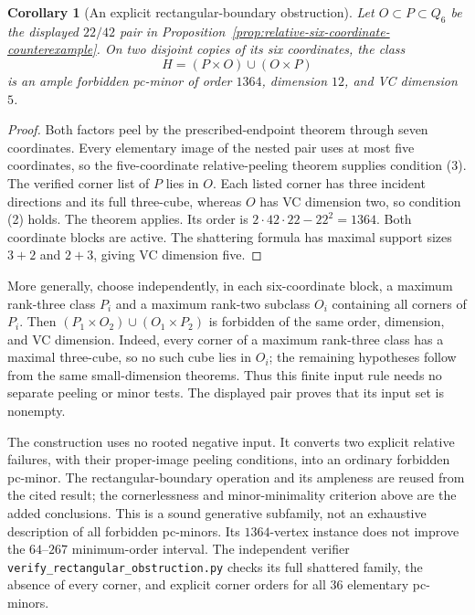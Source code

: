 \documentclass[11pt]{article}
\numberwithin{equation}{section}
\newtheorem{corollary}[theorem]{Corollary}
\theoremstyle{definition}
\theoremstyle{remark}
\begin{document}
\begin{corollary}[An explicit rectangular-boundary obstruction]
\label{cor:rectangular-boundary-1364}
Let $O\subset P\subset Q_6$ be the displayed $22/42$ pair in
Proposition~\ref{prop:relative-six-coordinate-counterexample}.
On two disjoint copies of its six coordinates, the class
\[
 H=(P\times O)\cup(O\times P)
\]
is an ample forbidden pc-minor of order $1364$, dimension $12$,
and VC dimension $5$.
\end{corollary}
\begin{proof}
Both factors peel by the prescribed-endpoint theorem through seven
coordinates. Every elementary image of the nested pair uses at most
five coordinates, so the five-coordinate relative-peeling theorem
\cite{BousquetDampReader} supplies condition (3).
The verified corner list of $P$ lies in $O$. Each listed corner has
three incident directions and its full three-cube, whereas $O$ has
VC dimension two, so condition (2) holds. The theorem applies.
Its order is $2\cdot42\cdot22-22^2=1364$. Both coordinate blocks
are active. The shattering formula has maximal support sizes $3+2$
and $2+3$, giving VC dimension five.
\end{proof}

More generally, choose independently, in each six-coordinate block,
a maximum rank-three class $P_i$ and a maximum rank-two subclass
$O_i$ containing all corners of $P_i$. Then
$(P_1\times O_2)\cup(O_1\times P_2)$ is forbidden of the same order,
dimension, and VC dimension. Indeed, every corner of a maximum
rank-three class has a maximal three-cube, so no such cube lies in
$O_i$; the remaining hypotheses follow from the same small-dimension
theorems. Thus this finite input rule needs no separate peeling or
minor tests. The displayed pair proves that its input set is nonempty.

The construction uses no rooted negative input. It converts two
explicit relative failures, with their proper-image peeling conditions,
into an ordinary forbidden pc-minor. The rectangular-boundary operation
and its ampleness are reused from the cited result; the cornerlessness
and minor-minimality criterion above are the added conclusions. This
is a sound generative subfamily, not an exhaustive description of all
forbidden pc-minors. Its $1364$-vertex instance does not improve the
$64$--$267$ minimum-order interval. The independent verifier
\texttt{verify\_rectangular\_obstruction.py} checks its full shattered
family, the absence of every corner, and explicit corner orders for
all $36$ elementary pc-minors.
\end{document}
